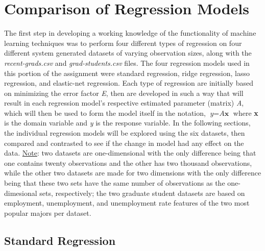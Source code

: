 \documentclass[a4paper,12pt]{IEEEtran}
\begin{document}
\section{Comparison of Regression Models}
The first step in developing a working knowledge of the functionality of machine learning techniques was to perform four different types of regression on four different system generated datasets of varying observation sizes, along with the \textit{recent-grads.csv} and \textit{grad-students.csv} files. The four regression models used in this portion of the assignment were standard regression, ridge regression, lasso regression, and elastic-net regression. Each type of regression are initially based on minimizing the error factor \textit{E}, then are developed in such a way that will result in each regression model's respective estimated parameter (matrix) \textit{A}, which will then be used to form the model itself in the notation, \(\textit{y} = \textit{A}\textbf{x}\) where \textbf{x} is the domain variable and \textit{y} is the response variable. In the following sections, the individual regression models will be explored using the six datasets, then compared and contrasted to see if the change in model had any effect on the data. \underline{Note}: two datasets are one-dimensional with the only difference being that one contains twenty observations and the other has two thousand observations, while the other two datasets are made for two dimensions with the only difference being that these two sets have the same number of observations as the one-dimesional sets, respectively; the two graduate student datasets are based on employment, unemployment, and unemployment rate features of the two most popular majors per dataset.

\subsection{Standard Regression}
\label{sec1}
\end{document}

